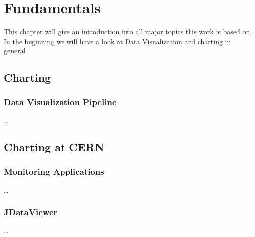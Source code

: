 

\chapter{Fundamentals}
\label{ch:fundamentals}

This chapter will give an introduction into all major topics this work
is based on. In the beginning we will have a look at Data Visualization
and charting in general


\section{Charting}
\label{sec:fundamentals:charting}

\subsection{Data Visualization Pipeline}

\dots



\section{Charting at CERN}
\label{sec:fundamentals:cerncharting}

\subsection{Monitoring Applications}

\dots

\subsection{JDataViewer}

\dots



